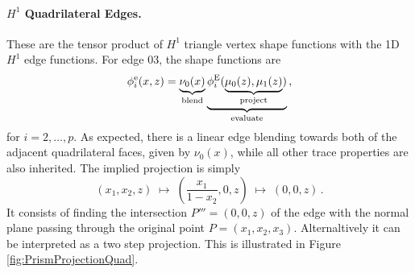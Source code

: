 \paragraph{\texorpdfstring{$H^1$}{H1} Quadrilateral Edges.}
These are the tensor product of $H^1$ triangle vertex shape functions with the 1D $H^1$ edge functions. 
For edge 03, the shape functions are
\begin{equation*}
	\phi_i^\mathrm{e}(x,z)=\underbrace{\nu_0(x)}_{\text{blend}}
		\underbrace{\phi_i^{\mathrm{E}}(\underbrace{\mu_0(z),\mu_1(z)}_{\text{project}})}_{\text{evaluate}}\,,
\end{equation*}
for $i=2,\ldots,p$.
As expected, there is a linear edge blending towards both of the adjacent quadrilateral faces, given by $\nu_0(x)$, while all other trace properties are also inherited.
The implied projection is simply
\begin{equation*}
	(x_1,x_2,z)\;\longmapsto\;(\textstyle{\frac{x_1}{1-x_2}},0,z)\;\longmapsto\;(0,0,z)\,.
\end{equation*}
It consists of finding the intersection $P'''=(0,0,z)$ of the edge with the normal plane passing through the original point $P=(x_1,x_2,x_3)$. 
Alternaltively it can be interpreted as a two step projection.
This is illustrated in Figure \ref{fig:PrismProjectionQuad}.

